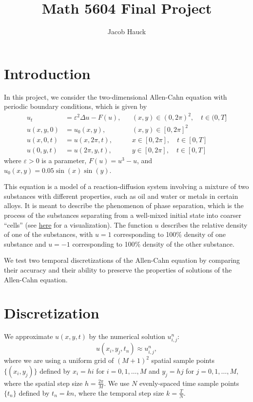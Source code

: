 \documentclass{article}
\title{Math 5604 Final Project}
\author{Jacob Hauck}
\begin{document}
	\maketitle
	
	\section{Introduction}
	
	In this project, we consider the two-dimensional Allen-Cahn equation \cite{yang_2018} with periodic boundary conditions, which is given by
	\begin{align}
		u_t &= \varepsilon^2 \Delta u - F(u),& & (x,y) \in (0,2\pi)^2,\quad t \in (0,T] \\
		u(x,y, 0) &= u_0(x,y),& & (x,y) \in [0,2\pi]^2 \\
		u(x, 0,t) &= u(x, 2\pi, t), & & x \in [0,2\pi],\quad t \in [0,T] \\
		u(0,y,t) &= u(2\pi,y,t), & & y \in [0,2\pi],\quad t \in [0,T]
	\end{align}
	where $\varepsilon > 0$ is a parameter, $F(u) = u^3 - u$, and $u_0(x,y) = 0.05\sin(x)\sin(y)$. 
	
	This equation is a model of a reaction-diffusion system involving a mixture of two substances with different properties, such as oil and water or metals in certain alloys. It is meant to describe the phenomenon of phase separation, which is the process of the substances separating from a well-mixed initial state into coarser ``cells'' (see \href{https://www.youtube.com/watch?v=t1swj0QJUTw}{here} for a visualization). The function $u$ describes the relative density of one of the substances, with $u = 1$ corresponding to 100\% density of one substance and $u=-1$ corresponding to 100\% density of the other substance.
	
	We test two temporal discretizations of the Allen-Cahn equation by comparing their accuracy and their ability to preserve the properties of solutions of the Allen-Cahn equation.
	
	\section{Discretization}
	We approximate $u(x,y,t)$ by the numerical solution $u^n_{i,j}$:
	\begin{equation}
		u(x_i,y_j, t_n) \approx u^n_{i,j},
	\end{equation}
	where we are using a uniform grid of $(M+1)^2$ spatial sample points $\{(x_i,y_j)\}$ defined by $x_i = hi$ for $i = 0,1,\dots, M$ and $y_j = hj$ for $j =0,1,\dots,M$, where the spatial step size $h = \frac{2\pi}{M}$. We use $N$ evenly-spaced time sample points $\{t_n\}$ defined by $t_n = kn$, where the temporal step size $k = \frac{T}{N}$.
	
\end{document}
